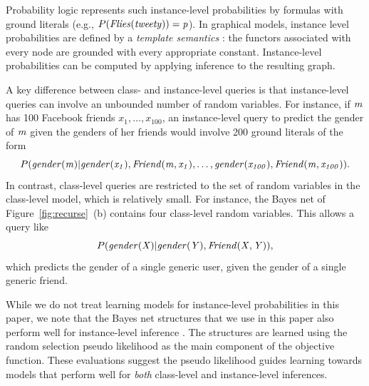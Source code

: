 \documentclass[oribibl]{llncs}
\begin{document}
Probability logic represents such instance-level probabilities by formulas with ground literals (e.g., $P(\it{Flies}(\it{tweety}))=p$). In graphical models, instance level probabilities are defined by a {\em template semantics}  \cite{getoor-intro}: the functors associated with every node are grounded with every appropriate constant. Instance-level probabilities can be computed by applying inference to the resulting graph.

A key difference between class- and instance-level queries is that instance-level queries can involve an unbounded number of random variables. For instance, if $\it{m}$ has 100 Facebook friends $x_{1},\ldots,x_{100}$, an instance-level query to predict the gender of $\it{m}$ given the genders of her friends would involve 200 ground literals of the form $$P(\it{gender}(\it{m})|\it{gender}(x_{1}),\it{Friend}(\it{m},x_{1}),\ldots, \it{gender}(x_{100}),\it{Friend}(\it{m},x_{100})).$$
In contrast,
class-level queries are restricted to the set of random variables in the class-level model, which is relatively small. For instance, the Bayes net of Figure~\ref{fig:recurse}~(b) contains four class-level random variables. This allows a query like $$P(\it{gender}(X)|\it{gender}(Y),\it{Friend}(X,Y)),$$ which predicts the gender of a single generic user, given the gender of a single generic friend. 

While we do not treat learning models for instance-level probabilities in this paper, we note that the Bayes net structures that we use in this paper also perform well for instance-level inference \cite{Schulte2012,Khosravi2010}. The structures are learned using the random selection pseudo likelihood as the main component of the objective function. These evaluations suggest the pseudo likelihood guides learning towards models that perform well for {\em both} class-level and instance-level inferences.
\end{document}
